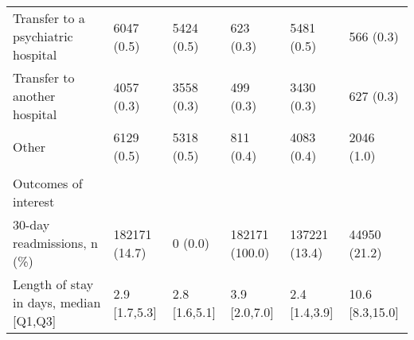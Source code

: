 \begin{adjustbox}{width={\textwidth},totalheight={\textheight},keepaspectratio,frame,padding=0ex 0ex -910ex 0ex}
{\begin{tabular}{L{20em}C{10em}C{10em}C{10em}C{10em}C{10em}}
  \hspace{3mm} Transfer to a psychiatric hospital & 6047 (0.5) & 5424 (0.5) & 623 (0.3) & 5481 (0.5) & 566 (0.3)\\
  \hspace{3mm} Transfer to another hospital & 4057 (0.3) & 3558 (0.3) & 499 (0.3) & 3430 (0.3) & 627 (0.3)\\
  \hspace{3mm} Other & 6129 (0.5) & 5318 (0.5) & 811 (0.4) & 4083 (0.4) & 2046 (1.0)\\
  &  &  &  &  &  \\
 Outcomes of interest &  &  &  &  &  \\
  \hspace{3mm} 30-day readmissions, n (\%)   & 182171 (14.7) & 0 (0.0)  & 182171 (100.0) & 137221 (13.4) & 44950 (21.2)\\
  \hspace{3mm} Length of stay in days, median [Q1,Q3]   & 2.9 [1.7,5.3] & 2.8 [1.6,5.1] & 3.9 [2.0,7.0] & 2.4 [1.4,3.9] & 10.6 [8.3,15.0]\\
\end{tabular}
\label{table:table1}
}
\end{adjustbox}
